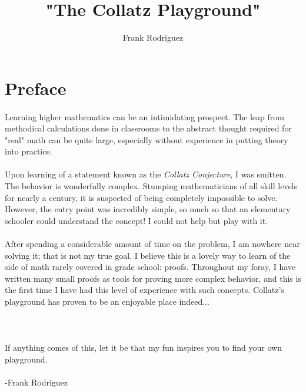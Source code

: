 \documentclass[12pt,letterpaper]{article}
\title{"The Collatz Playground"}
\author{Frank Rodriguez}
\date{}
\begin{document}
	
	\maketitle
	\newpage
	
	
	\tableofcontents
	\newpage
	
	\section*{Preface}
	
		\paragraph{} Learning higher mathematics can be an intimidating prospect. The leap from methodical calculations done in classrooms to the abstract thought required for "real" math can be quite large, especially without experience in putting theory into practice.
		 
		\paragraph{} Upon learning of a statement known as the \textit{Collatz Conjecture}, I was smitten. The behavior is wonderfully complex. Stumping mathematicians of all skill levels for nearly a century, it is suspected of being completely impossible to solve. However, the entry point was incredibly simple, so much so that an elementary schooler could understand the concept!  I could not help but play with it.
		
		\paragraph{} After spending a considerable amount of time on the problem, I am nowhere near solving it; that is not my true goal. I believe this is a lovely way to learn of the side of math rarely covered in grade school: proofs. Throughout my foray, I have written many small proofs as tools for proving more complex behavior, and this is the first time I have had this level of experience with such concepts. Collatz's playground has proven to be an enjoyable place indeed...
		\\ \\ \\
		
		\paragraph{} If anything comes of this, let it be that my fun inspires you to find your own playground. \\ \\ -Frank Rodriguez
		
\end{document}
